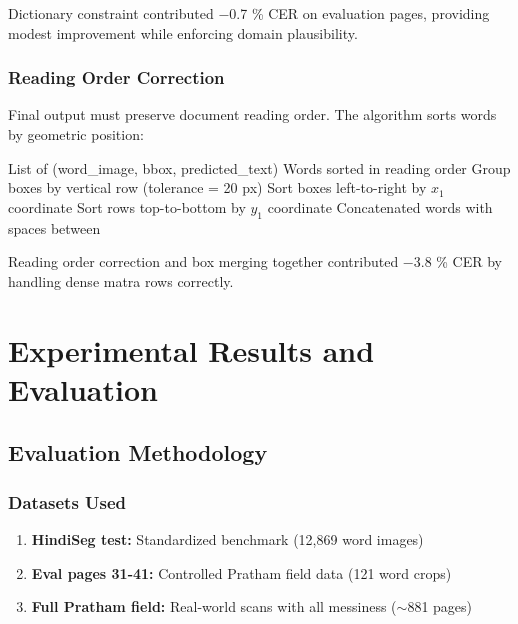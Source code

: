 \documentclass[14pt,a4paper]{article}
\begin{document}
Dictionary constraint contributed $-$0.7 \% CER on evaluation pages, providing modest improvement while enforcing domain plausibility.

\subsubsection{Reading Order Correction}

Final output must preserve document reading order. The algorithm sorts words by geometric position:

\begin{algorithm}
    \caption{Reading Order Sorting}
    \begin{algorithmic}[1]
        \Require List of (word\_image, bbox, predicted\_text)
        \Ensure Words sorted in reading order
        \State Group boxes by vertical row (tolerance = 20 px)
            \State Sort boxes left-to-right by $x_1$ coordinate
        \EndFor
        \State Sort rows top-to-bottom by $y_1$ coordinate
        \Return Concatenated words with spaces between
    \end{algorithmic}
\end{algorithm}

Reading order correction and box merging together contributed $-$3.8 \% CER by handling dense matra rows correctly.

\newpage
\section{Experimental Results and Evaluation}

\subsection{Evaluation Methodology}

\subsubsection{Datasets Used}

\begin{enumerate}
    \item \textbf{HindiSeg test:} Standardized benchmark (12,869 word images)
    \item \textbf{Eval pages 31-41:} Controlled Pratham field data (121 word crops)
    \item \textbf{Full Pratham field:} Real-world scans with all messiness ($\sim$881 pages)
\end{enumerate}
\end{document}
